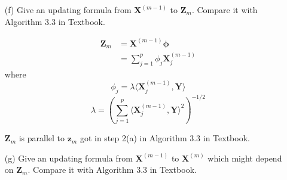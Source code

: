 \documentclass[10pt]{article}
\theoremstyle{definition}
\theoremstyle{remark}
\newcommand{\bz}{\bm{z}}
\newcommand{\Xb}{\mathbf{X}}
\newcommand{\bX}{\bm{X}}
\newcommand{\bY}{\bm{Y}}
\newcommand{\bZ}{\bm{Z}}
\newcommand{\bphi}{\bm{\phi}}
\begin{document}
\begin{enumerate}
\begin{itemize}[leftmargin=*]
		(\ref{eq_pls2}) is equivalent to
		\begin{align*}
		\begin{array}{rll}
		\max\limits_{\bphi} & \langle \bZ_{m},\bY \rangle \\
		\textrm{s.t.} 
		& \bZ_{m} = \Xb^{(m-1)}\bphi \\
		& \|\bphi\|_{2} = 1
		\end{array} 
		\end{align*}
		where
		\begin{align*}
		    \langle \bZ_{m},\bY \rangle & = \langle \Xb^{(m-1)}\bphi,\bY \rangle \\
		    & = \bphi^T\left(\Xb^{(m-1)}\right)^T\bY \\
		    & = \bphi^T \begin{bmatrix} \langle \Xb^{(m-1)}_{1},\bY \rangle \\ \vdots \\ \Xb^{(m-1)}_{p},\bY \end{bmatrix} \\
		    & = \sum_{j=1}^{p} \phi_{j} \langle \Xb^{(m-1)}_{j},\bY \rangle
		\end{align*}
		where $ \phi_{j} $ is the $j$th entry of $\bphi$, and $ \Xb^{(m-1)}_{j} $ is the $ j $th column of $ \Xb^{(m-1)} $.
		Solve the maximization problem, we get 
		\[ \phi_{j} = \lambda \langle \Xb^{(m-1)}_{j}, \bY \rangle  \] 
		where $ \lambda = \left( \sum_{j=1}^{p} \langle \Xb^{(m-1)}_{j}, \bY \rangle ^{2} \right)^{-1/2} $. Therefore, (\ref{eq_pls2}) reduces to a projection of $\bY$ on each column of $\Xb^{(m-1)}$.
		
		\item [(f)] Give an updating formula from $ \bX^{(m-1)} $ to $ \bZ_{m} $. Compare it with Algorithm 3.3 in Textbook.
		
		\begin{align*}
		    \bZ_{m} & = \Xb^{(m-1)}\bphi \\
		    & = \sum_{j=1}^{p} \phi_{j} \Xb^{(m-1)}_{j}
		\end{align*}
		where
		\[ \phi_{j} = \lambda \langle \Xb^{(m-1)}_{j}, \bY \rangle  \]
		\[ \lambda = \left( \sum_{j=1}^{p} \langle \Xb^{(m-1)}_{j}, \bY \rangle ^{2} \right)^{-1/2}  \]
		
		$\bZ_{m}$ is parallel to $\bz_{m}$ got in step 2(a) in Algorithm 3.3 in Textbook.
		
		\item [(g)] Give an updating formula from $ \Xb^{(m-1)} $ to $ \Xb^{(m)} $ which might depend on $ \bZ_{m} $. Compare it with Algorithm 3.3 in Textbook.
		

\end{itemize}
\end{enumerate}
\end{document}

